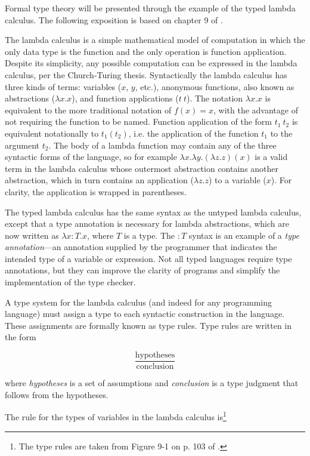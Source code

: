 \documentclass{article}
\begin{document}
Formal type theory will be presented through the example of the typed lambda calculus. The following exposition is based on chapter 9 of \cite{types}.

The lambda calculus is a simple mathematical model of computation in which the only data type is the function and the only operation is function application. Despite its simplicity, any possible computation can be expressed in the lambda calculus, per the Church-Turing thesis. Syntactically the lambda calculus has three kinds of terms: variables ($x$, $y$, etc.), anonymous functions, also known as abstractions ($\lambda x . x$), and function applications ($t\ t$). The notation $\lambda x . x$ is equivalent to the more traditional notation of $f(x) = x$, with the advantage of not requiring the function to be named. Function application of the form $t_1\ t_2$ is equivalent notationally to $t_1(t_2)$, i.e. the application of the function $t_1$ to the argument $t_2$. The body of a lambda function may contain any of the three syntactic forms of the language, so for example $\lambda x . \lambda y . (\lambda z . z)(x)$ is a valid term in the lambda calculus whose outermost abstraction contains another abstraction, which in turn contains an application ($\lambda z . z$) to a variable ($x$). For clarity, the application is wrapped in parentheses.

The typed lambda calculus has the same syntax as the untyped lambda calculus, except that a type annotation is necessary for lambda abstractions, which are now written as $\lambda x: T . x$, where $T$ is a type. The $: T$ syntax is an example of a \textit{type annotation}---an annotation supplied by the programmer that indicates the intended type of a variable or expression. Not all typed languages require type annotations, but they can improve the clarity of programs and simplify the implementation of the type checker.

A type system for the lambda calculus (and indeed for any programming language) must assign a type to each syntactic construction in the language. These assignments are formally known as type rules. Type rules are written in the form

\[
\frac{\text{hypotheses}}
{\text{conclusion}}
\]

\noindent where \textit{hypotheses} is a set of assumptions and \textit{conclusion} is a type judgment that follows from the hypotheses.

The rule for the types of variables in the lambda calculus is\footnote{The type rules are taken from Figure 9-1 on p. 103 of \cite{types}.}
\end{document}
